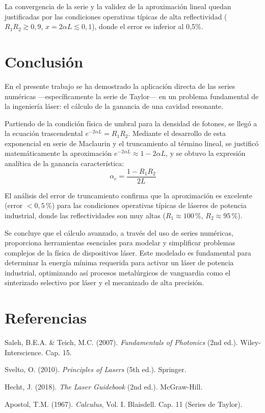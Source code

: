 \documentclass[12pt, a4paper]{article}
\begin{document}
La convergencia de la serie y la validez de la aproximación lineal quedan justificadas
por las condiciones operativas típicas de alta reflectividad
($R_1 R_2 \gtrsim 0{,}9$, $x = 2\alpha L \lesssim 0{,}1$), donde el error es inferior
al 0{,}5\%.

\section{Conclusión}

En el presente trabajo se ha demostrado la aplicación directa de las series numéricas
—específicamente la serie de Taylor— en un problema fundamental de la ingeniería láser:
el cálculo de la ganancia de una cavidad resonante.

Partiendo de la condición física de umbral para la densidad de fotones, se llegó a la
ecuación trascendental $e^{-2\alpha L} = R_1 R_2$. Mediante el desarrollo de esta
exponencial en serie de Maclaurin y el truncamiento al término lineal, se justificó
matemáticamente la aproximación $e^{-2\alpha L} \approx 1 - 2\alpha L$, y se obtuvo la
expresión analítica de la ganancia característica:
%
\begin{equation*}
  \alpha_c = \frac{1 - R_1 R_2}{2L}
\end{equation*}

El análisis del error de truncamiento confirma que la aproximación es excelente
(error $< 0{,}5\,\%$) para las condiciones operativas típicas de láseres de potencia
industrial, donde las reflectividades son muy altas ($R_1 \approx 100\,\%$,
$R_2 \approx 95\,\%$).

Se concluye que el cálculo avanzado, a través del uso de series numéricas, proporciona
herramientas esenciales para modelar y simplificar problemas complejos de la física de
dispositivos láser. Este modelado es fundamental para determinar la energía mínima
requerida para activar un láser de potencia industrial, optimizando así procesos
metalúrgicos de vanguardia como el sinterizado selectivo por láser y el mecanizado de
alta precisión.

\section*{Referencias}

\begin{enumerate}[leftmargin=2em, label={[\arabic*]}]
  \item Saleh, B.E.A. \& Teich, M.C. (2007). \textit{Fundamentals of Photonics} (2nd ed.).
        Wiley-Interscience. Cap. 15.
  \item Svelto, O. (2010). \textit{Principles of Lasers} (5th ed.). Springer.
  \item Hecht, J. (2018). \textit{The Laser Guidebook} (2nd ed.). McGraw-Hill.
  \item Apostol, T.M. (1967). \textit{Calculus}, Vol. I. Blaisdell. Cap. 11 (Series de Taylor).
\end{enumerate}
\end{document}
